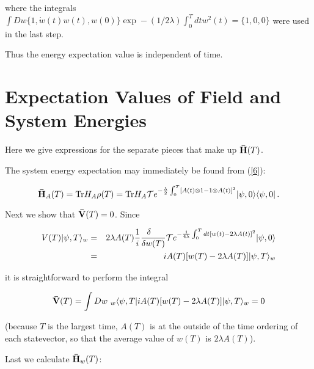 \documentclass[12pt]{article}
\begin{document}
\noindent where the integrals 
$\int Dw\{1,\dot{w}(t)w(t),w(0)\}\exp-(1/2\lambda)\int_{0}^{T}dtw^{2}(t)=\{1,0,0\}$ 
were used in the last step. 

	Thus the energy expectation value is independent of time.  

 \section{Expectation Values of Field and System Energies}\label{Expectation Values}
 
\hspace{\parindent}Here we give expressions for the separate pieces that 
make up ${\bf \bar{H}}(T)$.

	The system energy expectation may immediately be found from (\ref{6}):
	
\begin{equation}\label{13}
{\bf \bar{H}}_{A}(T)={\rm Tr} H_{A}\rho(T)
={\rm Tr}H_{A}{\cal T}e^
	{-\frac{\lambda}{2}\int_{0}^{T}[A(t)\otimes 1-1\otimes A(t)]^{2}}
	|\psi,0\rangle\langle \psi,0|\, .
\end{equation}

	Next we show that ${\bf \bar{V}}(T)=0$. Since 

\begin{eqnarray*}
V(T)|\psi,T\rangle_{w}& =& 2\lambda A(T)\frac{1}{i}\frac{\delta\quad}{\delta w(T)}
{\cal T} e^{-\frac{1}{4\lambda}\int_{0}^{T}dt[w(t)-2\lambda A(t)]^{2}}|\psi,0\rangle\\
& =&iA(T)[w(T)-2\lambda A(T)]|\psi,T\rangle_{w}	
\end{eqnarray*}

\noindent it is straightforward to perform the integral 

\begin{eqnarray*}
{\bf \bar{V}}(T)= \int Dw\ _{w}\langle \psi,T|iA(T)[w(T)-2\lambda A(T)]|\psi,T\rangle_{w}=0
\end{eqnarray*}

\noindent  (because  
$T$ is the largest time, $A(T)$ is at the outside of the time ordering of each statevector, 
so that the average value of $w(T)$ is $2\lambda A(T)$). 

	Last we calculate ${\bf \bar{H}}_{w}(T)$:
	
\end{document}
